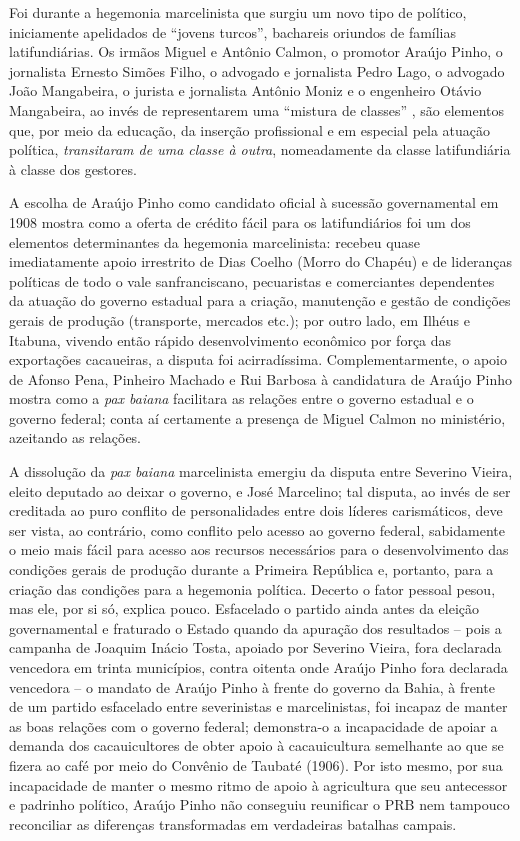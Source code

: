 Foi durante a hegemonia marcelinista que surgiu um novo tipo de político, iniciamente apelidados de ``jovens turcos'', bachareis oriundos de famílias latifundiárias. Os irmãos Miguel e Antônio Calmon, o promotor Araújo Pinho, o jornalista Ernesto Simões Filho, o advogado e jornalista Pedro Lago, o advogado João Mangabeira, o jurista e jornalista Antônio Moniz e o engenheiro Otávio Mangabeira, ao invés de representarem uma ``mistura de classes'' \cite[p.~93]{pang_coronelismo_1979}, são elementos que, por meio da educação, da inserção profissional e em especial pela atuação política, \textit{transitaram de uma classe à outra}, nomeadamente da classe latifundiária à classe dos gestores.

A escolha de Araújo Pinho como candidato oficial à sucessão governamental em 1908 mostra como a oferta de crédito fácil para os latifundiários foi um dos elementos determinantes da hegemonia marcelinista: recebeu quase imediatamente apoio irrestrito de Dias Coelho (Morro do Chapéu) e de lideranças políticas de todo o vale sanfranciscano, pecuaristas e comerciantes dependentes da atuação do governo estadual para a criação, manutenção e gestão de condições gerais de produção (transporte, mercados etc.); por outro lado, em Ilhéus e Itabuna, vivendo então rápido desenvolvimento econômico por força das exportações cacaueiras, a disputa foi acirradíssima. Complementarmente, o apoio de Afonso Pena, Pinheiro Machado e Rui Barbosa à candidatura de Araújo Pinho mostra como a \textit{pax baiana} facilitara as relações entre o governo estadual e o governo federal; conta aí certamente a presença de Miguel Calmon no ministério, azeitando as relações.

A dissolução da \textit{pax baiana} marcelinista emergiu da disputa entre Severino Vieira, eleito deputado ao deixar o governo, e José Marcelino; tal disputa, ao invés de ser creditada ao puro conflito de personalidades entre dois líderes carismáticos, deve ser vista, ao contrário, como conflito pelo acesso ao governo federal, sabidamente o meio mais fácil para acesso aos recursos necessários para o desenvolvimento das condições gerais de produção durante a Primeira República e, portanto, para a criação das condições para a hegemonia política. Decerto o fator pessoal pesou, mas ele, por si só, explica pouco. Esfacelado o partido ainda antes da eleição governamental e fraturado o Estado quando da apuração dos resultados -- pois a campanha de Joaquim Inácio Tosta, apoiado por Severino Vieira, fora declarada vencedora em trinta municípios, contra oitenta onde Araújo Pinho fora declarada vencedora -- o mandato de Araújo Pinho à frente do governo da Bahia, à frente de um partido esfacelado entre severinistas e marcelinistas, foi incapaz de manter as boas relações com o governo federal; demonstra-o a incapacidade de apoiar a demanda dos cacauicultores de obter apoio à cacauicultura semelhante ao que se fizera ao café por meio do Convênio de Taubaté (1906). Por isto mesmo, por sua incapacidade de manter o mesmo ritmo de apoio à agricultura que seu antecessor e padrinho político, Araújo Pinho não conseguiu reunificar o PRB nem tampouco reconciliar as diferenças transformadas em verdadeiras batalhas campais.

